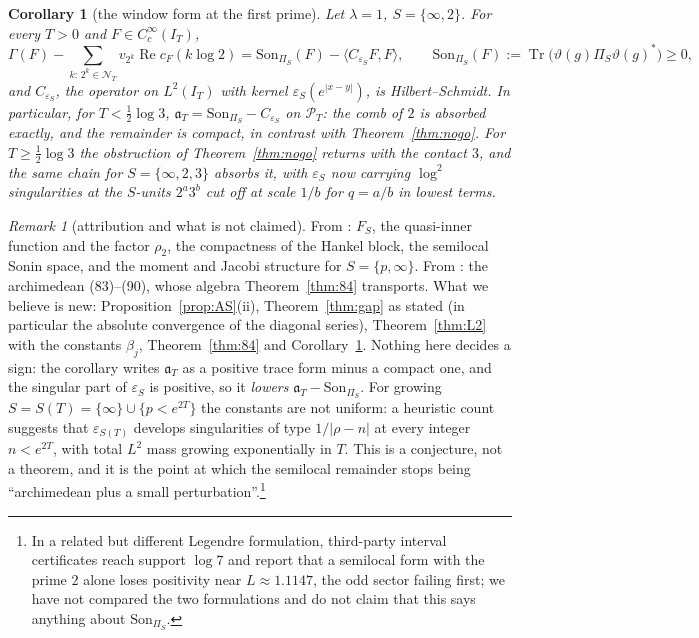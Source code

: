 \documentclass[11pt]{amsart}
\newtheorem{corollary}[theorem]{Corollary}
\theoremstyle{definition}
\theoremstyle{remark}
\newtheorem{remark}[theorem]{Remark}
\newcommand{\Rel}{\operatorname{Re}}
\newcommand{\Tr}{\operatorname{Tr}}
\newcommand{\IT}{I_T}
\newcommand{\PT}{\mathcal P_T}
\newcommand{\cF}{c_F}
\newcommand{\NT}{\mathcal N_T}
\newcommand{\Son}{\mathrm{Son}}
\begin{document}
\begin{corollary}[the window form at the first prime]\label{cor:split}
Let $\lambda=1$, $S=\{\infty,2\}$. For every $T>0$ and $F\in C_c^\infty(\IT)$,
\[
\Gamma(F)-\sum_{k:\,2^k\in\NT}v_{2^k}\Rel\cF(k\log2)=\Son_{\Pi_S}(F)-\langle C_{\varepsilon_S}F,F\rangle,\qquad
\Son_{\Pi_S}(F):=\Tr\big(\vartheta(g)\Pi_S\vartheta(g)^*\big)\ge0,
\]
and $C_{\varepsilon_S}$, the operator on $L^2(\IT)$ with kernel $\varepsilon_S(e^{|x-y|})$, is Hilbert--Schmidt. In particular, for
$T<\frac12\log3$, $\mathfrak a_T=\Son_{\Pi_S}-C_{\varepsilon_S}$ on $\PT$: the comb of $2$ is absorbed exactly, and the remainder
is compact, in contrast with Theorem~\ref{thm:nogo}. For $T\ge\frac12\log3$ the obstruction of Theorem~\ref{thm:nogo} returns
with the contact $3$, and the same chain for $S=\{\infty,2,3\}$ absorbs it, with $\varepsilon_S$ now carrying $\log^2$
singularities at the $S$-units $2^a3^b$ cut off at scale $1/b$ for $q=a/b$ in lowest terms.
\end{corollary}

\begin{remark}[attribution and what is not claimed]
From \cite{CCquasi,CCM2023,CCM2024}: $F_S$, the quasi-inner function and the factor $\rho_2$, the compactness of the Hankel
block, the semilocal Sonin space, and the moment and Jacobi structure for $S=\{p,\infty\}$. From \cite{CC2021}: the
archimedean (83)--(90), whose algebra Theorem~\ref{thm:84} transports. What we believe is new: Proposition~\ref{prop:AS}(ii),
Theorem~\ref{thm:gap} as stated (in particular the absolute convergence of the diagonal series), Theorem~\ref{thm:L2} with the
constants $\beta_j$, Theorem~\ref{thm:84} and Corollary~\ref{cor:split}. Nothing here decides a sign: the corollary writes
$\mathfrak a_T$ as a positive trace form minus a compact one, and the singular part of $\varepsilon_S$ is positive, so it
\emph{lowers} $\mathfrak a_T-\Son_{\Pi_S}$. For growing $S=S(T)=\{\infty\}\cup\{p<e^{2T}\}$ the constants are not uniform: a
heuristic count suggests that $\varepsilon_{S(T)}$ develops singularities of type $1/|\rho-n|$ at every integer $n<e^{2T}$, with
total $L^2$ mass growing exponentially in $T$. This is a conjecture, not a theorem, and it is the point at which the
semilocal remainder stops being ``archimedean plus a small perturbation''.\footnote{In a related but different
Legendre formulation, third-party interval certificates reach support $\log7$ and report that a semilocal form with the
prime $2$ alone loses positivity near $L\approx1.1147$, the odd sector failing first; we have not compared the two
formulations and do not claim that this says anything about $\Son_{\Pi_S}$.}
\end{remark}
\end{document}
